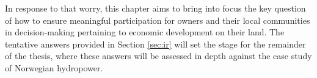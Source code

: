%
%

In response to that worry, this chapter aims to bring into focus the key question of how to ensure meaningful participation for owners and their local communities in decision-making pertaining to economic development on their land. The tentative answers provided in Section \ref{sec:ir} will set the stage for the remainder of the thesis, where these answers will be assessed in depth against the case study of Norwegian hydropower.


